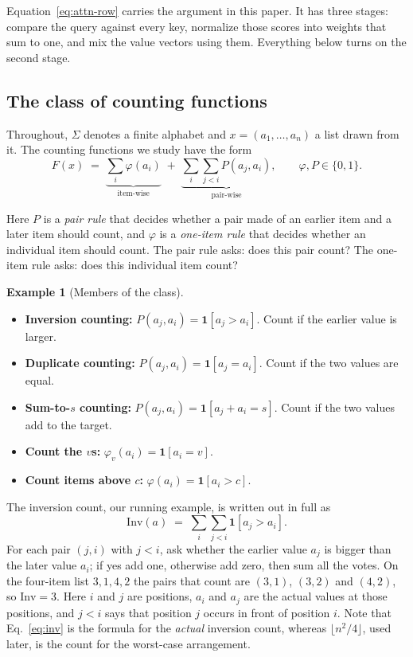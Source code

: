 \documentclass[10pt]{article}
\theoremstyle{definition}
\newtheorem{example}{Example}
\newcommand{\Inv}{\mathrm{Inv}}
\begin{document}
Equation~\eqref{eq:attn-row} carries the argument in this paper. It
has three stages: compare the query against every key, normalize those
scores into weights that sum to one, and mix the value vectors using them.
Everything below turns on the second stage.

\subsection{The class of counting functions}
\label{sec:class}

Throughout, $\Sigma$ denotes a finite alphabet and $x = (a_1,\dots,a_n)$ a
list drawn from it. The counting functions we study have the form
\begin{equation}
F(x) \;=\; \underbrace{\sum_{i} \varphi(a_i)}_{\text{item-wise}}
        \;+\; \underbrace{\sum_{i}\sum_{j<i} P(a_j, a_i)}_{\text{pair-wise}},
\qquad \varphi, P \in \{0,1\}.
\label{eq:class}
\end{equation}

Here $P$ is a \emph{pair rule} that decides whether a pair made of an
earlier item and a later item should count, and $\varphi$ is a
\emph{one-item rule} that decides whether an individual item should count.
The pair rule asks: does this pair count? The one-item rule asks: does
this individual item count?

\begin{example}[Members of the class]
\label{ex:members}
\begin{itemize}
\item \textbf{Inversion counting:} $P(a_j, a_i) = \mathbf{1}[a_j > a_i]$.
  Count if the earlier value is larger.
\item \textbf{Duplicate counting:} $P(a_j, a_i) = \mathbf{1}[a_j = a_i]$.
  Count if the two values are equal.
\item \textbf{Sum-to-$s$ counting:} $P(a_j, a_i) = \mathbf{1}[a_j + a_i = s]$.
  Count if the two values add to the target.
\item \textbf{Count the $v$s:} $\varphi_v(a_i) = \mathbf{1}[a_i = v]$.
\item \textbf{Count items above $c$:} $\varphi(a_i) = \mathbf{1}[a_i > c]$.
\end{itemize}
\end{example}

The inversion count, our running example, is written out in full as
\begin{equation}
\Inv(a) \;=\; \sum_i \sum_{j<i} \mathbf{1}[a_j > a_i].
\label{eq:inv}
\end{equation}
For each pair $(j,i)$ with $j<i$, ask whether the earlier value $a_j$ is
bigger than the later value $a_i$; if yes add one, otherwise add zero,
then sum all the votes. On the four-item list $3, 1, 4, 2$ the pairs that
count are $(3,1)$, $(3,2)$ and $(4,2)$, so $\Inv = 3$. Here $i$ and $j$ are positions, $a_i$ and $a_j$
are the actual values at those positions, and $j < i$ says that position
$j$ occurs in front of position $i$. Note that Eq.~\eqref{eq:inv} is the
formula for the \emph{actual} inversion count, whereas $\lfloor n^2/4
\rfloor$, used later, is the count for the worst-case arrangement.
\end{document}
